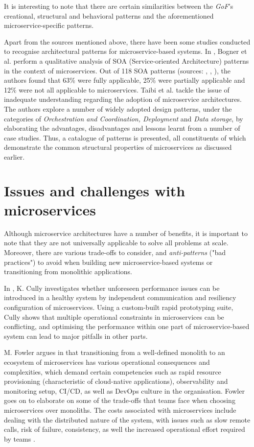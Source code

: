 It is interesting to note that there are certain similarities between the \textit{GoF}'s creational, structural and behavioral patterns \cite{gof94} and the aforementioned microservice-specific patterns. \linebreak

Apart from the sources mentioned above, there have been some studies conducted to recognise architectural patterns for microservice-based systems. In \cite{bogner18}, Bogner et al. perform a qualitative analysis of SOA (Service-oriented Architecture) patterns in the context of microservices. Out of 118 SOA patterns (sources: \cite{erl09}, \cite{erl12}, \cite{rotem12}), the authors found that 63\% were fully applicable, 25\% were partially applicable and 12\% were not all applicable to
microservices. Taibi et al. \cite{taibi18} tackle the issue of inadequate understanding regarding the adoption of microservice architectures. The authors explore a number of widely adopted design patterns, under the categories of \textit{Orchestration and Coordination, Deployment} and \textit{Data storage}, by elaborating the advantages, disadvantages and lessons learnt from a number of case studies. Thus, a catalogue of patterns is presented, all constituents of which demonstrate the common structural properties of microservices as discussed earlier.

\section{Issues and challenges with microservices}

Although microservice architectures have a number of benefits, it is important to note that they are not universally applicable to solve all problems at scale. Moreover, there are various trade-offs to consider, and \textit{anti-patterns} ("bad practices") to avoid when building new microservice-based systems or transitioning from monolithic applications.

In \cite{cully20}, K. Cully investigates whether unforeseen performance issues can be introduced in a healthy system by independent communication and resiliency configuration of microservices. Using a custom-built rapid prototyping suite, Cully shows that multiple operational constraints in microservices can be conflicting, and optimising the performance within one part of microservice-based system can lead to major pitfalls in other parts.

M. Fowler argues in \cite{fowler14} that transitioning from a well-defined monolith to an ecosystem of microservices has various operational consequences and complexities, which demand certain competencies such as rapid resource provisioning (characteristic of cloud-native applications), observability and monitoring setup, CI/CD, as well as DevOps culture in the organisation. Fowler goes on to elaborate on some of the trade-offs that teams face when choosing microservices over monoliths. The costs associated with microservices include dealing with the distributed nature of the system, with issues such as slow remote calls, risk of failure, consistency, as well the increased operational effort required by teams \cite{fowler15}.

